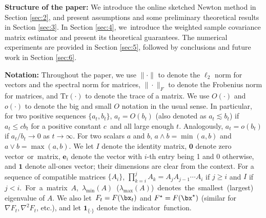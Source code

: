 \vskip0.3cm

\noindent \textbf{Structure of the paper:} 
We introduce the online sketched Newton method in Section \ref{sec:2}, and present assumptions and some preliminary theoretical results in Section \ref{sec:3}. In Section \ref{sec:4}, we~introduce the weighted sample covariance matrix estimator and present its theoretical guarantees. The numerical experiments are provided in Section \ref{sec:5}, followed by conclusions and future work in Section \ref{sec:6}.


\vskip0.3cm

\noindent \textbf{Notation:} 
Throughout the paper, we use $\|\cdot\|$ to denote the $\ell_2$ norm for vectors and the spectral norm for matrices, $\|\cdot\|_F$ to denote the Frobenius norm for matrices, and $\text{Tr}(\cdot)$ to denote the trace of a matrix. We use $O(\cdot)$ and $o(\cdot)$ to denote the big and small $O$ notation in the usual sense. In particular, for two positive sequences $\{a_t, b_t\}$, $a_t=O(b_t)$ (also denoted as $a_t\lesssim b_t$) if $a_t\leq cb_t$ for a positive constant $c$~and all large enough $t$. Analogously, $a_t=o(b_t)$ if $a_t/b_t\rightarrow 0$ as $t\rightarrow\infty$. For two scalars $a$ and $b$, $a\wedge b=\min(a, b)$ and $a\vee b = \max(a,b)$. We let $I$ denote the identity matrix, $\boldsymbol{0}$ denote zero vector~or~matrix, $\boldsymbol{e}_i$ denote the vector with $i$-th entry being 1 and 0 otherwise, and $\boldsymbol{1}$ denote all-ones vector; their dimensions are clear from the context. For a sequence of compatible matrices $\{A_i\}$, $\prod_{k=i}^jA_k = A_j A_{j-1}\cdots A_i$ if $j\geq i$ and $I$ if $j<i$.~For~a~matrix~$A$,~$\lambda_{\min}(A)$~($\lambda_{\max}(A)$)~denotes~the~smallest~(largest) eigenvalue of $A$. We also let~$F_t = F(\bx_t)$ and $F^\star = F(\bx^\star)$ (similar for $\nabla F_t, \nabla^2F_t$, etc.), and let $\mathbf{1}_{\{\cdot\}}$ denote the indicator~function. 
